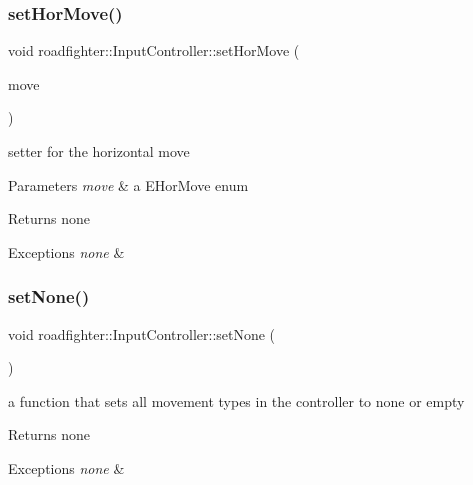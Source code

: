 \subsubsection{\texorpdfstring{set\+Hor\+Move()}{setHorMove()}}
{\footnotesize\ttfamily void roadfighter\+::\+Input\+Controller\+::set\+Hor\+Move (\begin{DoxyParamCaption}\item[{E\+Hor\+Move}]{move }\end{DoxyParamCaption})}

setter for the horizontal move 
\begin{DoxyParams}{Parameters}
{\em move} & a E\+Hor\+Move enum \\
\hline
\end{DoxyParams}
\begin{DoxyReturn}{Returns}
none 
\end{DoxyReturn}

\begin{DoxyExceptions}{Exceptions}
{\em none} & \\
\hline
\end{DoxyExceptions}
\mbox{\label{classroadfighter_1_1InputController_a729813bffe0b3180acc07ce54f6c7078}} 
\subsubsection{\texorpdfstring{set\+None()}{setNone()}}
{\footnotesize\ttfamily void roadfighter\+::\+Input\+Controller\+::set\+None (\begin{DoxyParamCaption}{ }\end{DoxyParamCaption})}

a function that sets all movement types in the controller to none or empty \begin{DoxyReturn}{Returns}
none 
\end{DoxyReturn}

\begin{DoxyExceptions}{Exceptions}
{\em none} & \\
\hline
\end{DoxyExceptions}
\mbox{\label{classroadfighter_1_1InputController_a962ec0e6e8247ca42db314c04ce65399}} 
